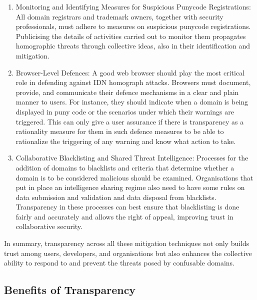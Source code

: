 \begin{itemize}
  \begin{enumerate}
  \item Monitoring and Identifying Measures for Suspicious Punycode Registrations: All domain registrars and trademark owners, together with security professionals, must adhere to measures on suspicious punycode registrations. Publicising the details of activities carried out to monitor them propagates homographic threats through collective ideas, also in their identification and mitigation.
  \item Browser-Level Defences: A good web browser should play the most critical role in defending against IDN homograph attacks. Browsers must document, provide, and communicate their defence mechanisms in a clear and plain manner to users. For instance, they should indicate when a domain is being displayed in puny code or the scenarios under which their warnings are triggered. This can only give a user assurance if there is transparency as a rationality measure for them in such defence measures to be able to rationalize the triggering of any warning and know what action to take.
  \item Collaborative Blacklisting and Shared Threat Intelligence: Processes for the addition of domains to blacklists and criteria that determine whether a domain is to be considered malicious should be examined. Organisations that put in place an intelligence sharing regime also need to have some rules on data submission and validation and data disposal from blacklists. Transparency in these processes can best ensure that blacklisting is done fairly and accurately and allows the right of appeal, improving trust in collaborative security.
\end{enumerate}
  
  
\end{itemize}

In summary, transparency across all these mitigation techniques not only builds trust among users, developers, and organisations but also enhances the collective ability to respond to and prevent the threats posed by confusable domains.

\subsection{Benefits of Transparency }

